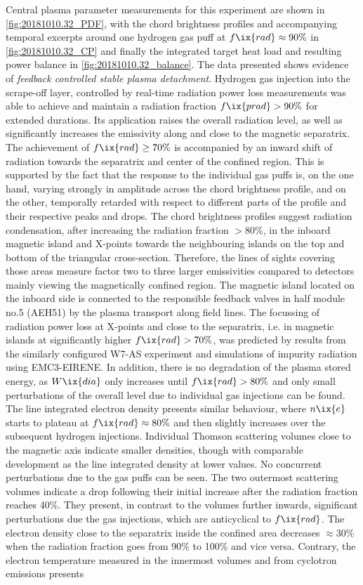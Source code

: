 %
            Central plasma parameter measurements for this experiment are shown in \cref{fig:20181010.32_PDF}, with the chord brightness profiles and accompanying temporal excerpts around one hydrogen gas puff at $f\ix{rad}\approx90\%$ in \cref{fig:20181010.32_CP} and finally the integrated target heat load and resulting power balance in \cref{fig:20181010.32_balance}. The data presented shows evidence of \textit{feedback controlled stable plasma detachment}. Hydrogen gas injection into the scrape-off layer, controlled by real-time radiation power loss measurements was able to achieve and maintain a radiation fraction $f\ix{prad}>90\%$ for extended durations. Its application raises the overall radiation level, as well as significantly increases the emissivity along and close to the magnetic separatrix. The achievement of $f\ix{rad}\ge70\%$ is accompanied by an inward shift of radiation towards the separatrix and center of the confined region. This is supported by the fact that the response to the individual gas puffs is, on the one hand, varying strongly in amplitude across the chord brightness profile, and on the other, temporally retarded with respect to different parts of the profile and their respective peaks and drops. The chord brightness profiles suggest radiation condensation, after increasing the radiation fraction $>80\%$, in the inboard magnetic island and X-points towards the neighbouring islands on the top and bottom of the triangular cross-section. Therefore, the lines of sights covering those areas measure factor two to three larger emissivities compared to detectors mainly viewing the magnetically confined region. The magnetic island located on the inboard side is connected to the responsible feedback valves in half module no.5 (AEH51) by the plasma transport along field lines. The focussing of radiation power loss at X-points and close to the separatrix, i.e. in magnetic islands at significantly higher $f\ix{rad}>70\%$, was predicted by results from the similarly configured W7-AS experiment and simulations of impurity radiation using EMC3-EIRENE\cite{Feng2005,Thomsen2004,Feng2016}. In addition, there is no degradation of the plasma stored energy, as $W\ix{dia}$ only increases until $f\ix{rad}>80\%$ and only small perturbations of the overall level due to individual gas injections can be found. The line integrated electron density presents similar behaviour, where $n\ix{e}$ starts to plateau at $f\ix{rad}\approx80\%$ and then slightly increases over the subsequent hydrogen injections. Individual Thomson scattering volumes close to the magnetic axis indicate smaller densities, though with comparable development as the line integrated density at lower values. No concurrent perturbations due to the gas puffs can be seen. The two outermost scattering volumes indicate a drop following their initial increase after the radiation fraction reaches 40\%. They present, in contrast to the volumes further inwards, significant perturbations due the gas injections, which are anticyclical to $f\ix{rad}$. The electron density close to the separatrix inside the confined area decreases $\approx30\%$ when the radiation fraction goes from 90\% to 100\% and vice versa. Contrary, the electron temperature measured in the innermost volumes and from cyclotron emissions presents 